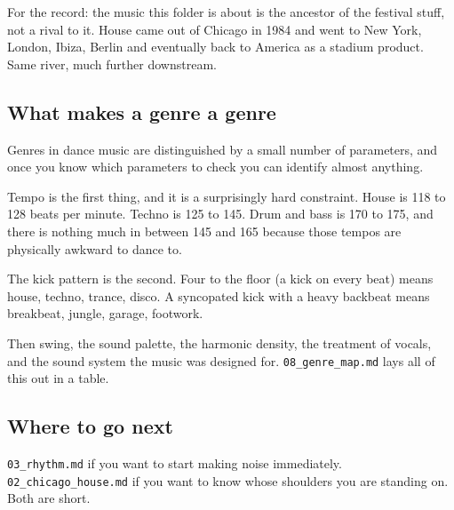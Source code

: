For the record: the music this folder is about is the ancestor of the festival stuff, not a
rival to it. House came out of Chicago in 1984 and went to New York, London, Ibiza, Berlin
and eventually back to America as a stadium product. Same river, much further downstream.

\subsection{What makes a genre a genre}\label{th01_what_edm_is-what-makes-a-genre-a-genre}

Genres in dance music are distinguished by a small number of parameters, and once you know
which parameters to check you can identify almost anything.

Tempo is the first thing, and it is a surprisingly hard constraint. House is 118 to 128
beats per minute. Techno is 125 to 145. Drum and bass is 170 to 175, and there is nothing
much in between 145 and 165 because those tempos are physically awkward to dance to.

The kick pattern is the second. Four to the floor (a kick on every beat) means house,
techno, trance, disco. A syncopated kick with a heavy backbeat means breakbeat, jungle,
garage, footwork.

Then swing, the sound palette, the harmonic density, the treatment of vocals, and the sound
system the music was designed for. \texttt{08\_genre\_map.md} lays all of this out in a table.

\subsection{Where to go next}\label{th01_what_edm_is-where-to-go-next}

\texttt{03\_rhythm.md} if you want to start making noise immediately. \texttt{02\_chicago\_house.md} if you
want to know whose shoulders you are standing on. Both are short.

